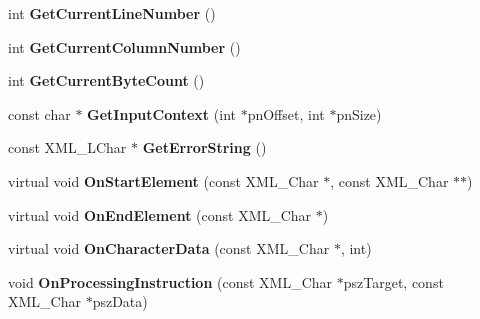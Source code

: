\begin{DoxyCompactItemize}
\item 
\hypertarget{class_c_expat_impl_ab6ef6ce8ef73ed2a454f6375ab7b665f}{int {\bfseries Get\+Current\+Line\+Number} ()}\label{class_c_expat_impl_ab6ef6ce8ef73ed2a454f6375ab7b665f}

\item 
\hypertarget{class_c_expat_impl_aad097c9be6cd886a799eee992670d9de}{int {\bfseries Get\+Current\+Column\+Number} ()}\label{class_c_expat_impl_aad097c9be6cd886a799eee992670d9de}

\item 
\hypertarget{class_c_expat_impl_a984d18a346ce61788df2f697e1f3ab61}{int {\bfseries Get\+Current\+Byte\+Count} ()}\label{class_c_expat_impl_a984d18a346ce61788df2f697e1f3ab61}

\item 
\hypertarget{class_c_expat_impl_a9d270067e041578c57eb71a1238ed717}{const char $\ast$ {\bfseries Get\+Input\+Context} (int $\ast$pn\+Offset, int $\ast$pn\+Size)}\label{class_c_expat_impl_a9d270067e041578c57eb71a1238ed717}

\item 
\hypertarget{class_c_expat_impl_af463b2fa4776e97d9c0f62fc8333f9f6}{const X\+M\+L\+\_\+\+L\+Char $\ast$ {\bfseries Get\+Error\+String} ()}\label{class_c_expat_impl_af463b2fa4776e97d9c0f62fc8333f9f6}

\item 
\hypertarget{class_c_expat_impl_a6d55b0a0780e1efe146f9f50fe185b0c}{virtual void {\bfseries On\+Start\+Element} (const X\+M\+L\+\_\+\+Char $\ast$, const X\+M\+L\+\_\+\+Char $\ast$$\ast$)}\label{class_c_expat_impl_a6d55b0a0780e1efe146f9f50fe185b0c}

\item 
\hypertarget{class_c_expat_impl_a6962fc4f31d67cf49b58808af8283811}{virtual void {\bfseries On\+End\+Element} (const X\+M\+L\+\_\+\+Char $\ast$)}\label{class_c_expat_impl_a6962fc4f31d67cf49b58808af8283811}

\item 
\hypertarget{class_c_expat_impl_ad8672419bee213eea1d12c7180ffa797}{virtual void {\bfseries On\+Character\+Data} (const X\+M\+L\+\_\+\+Char $\ast$, int)}\label{class_c_expat_impl_ad8672419bee213eea1d12c7180ffa797}

\item 
\hypertarget{class_c_expat_impl_a403235345e254d13e69124b47c0160d8}{void {\bfseries On\+Processing\+Instruction} (const X\+M\+L\+\_\+\+Char $\ast$psz\+Target, const X\+M\+L\+\_\+\+Char $\ast$psz\+Data)}\label{class_c_expat_impl_a403235345e254d13e69124b47c0160d8}


\end{DoxyCompactItemize}
